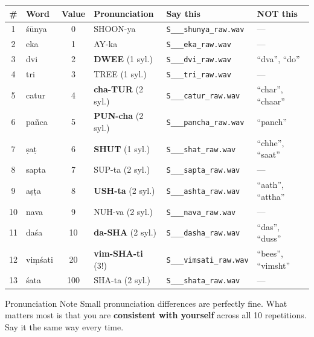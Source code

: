 \documentclass[11pt,a4paper]{article}
\begin{document}
\vspace{0.3cm}
\begin{center}
\renewcommand{\arraystretch}{1.3}
\begin{tabular}{clclll}
\toprule
\textbf{\#} & \textbf{Word} & \textbf{Value} &
\textbf{Pronunciation} & \textbf{Say this} & \textbf{NOT this} \\
\midrule
 1  & \'{s}\={u}nya       & 0   & SHOON-ya   & \texttt{S\_\_\_shunya\_raw.wav}  & --- \\
 2  & eka                  & 1   & AY-ka      & \texttt{S\_\_\_eka\_raw.wav}     & --- \\
 3  & dvi                  & 2   & \textbf{DWEE} (1 syl.)    & \texttt{S\_\_\_dvi\_raw.wav}     & ``dva'', ``do'' \\
 4  & tri                  & 3   & TREE (1 syl.)             & \texttt{S\_\_\_tri\_raw.wav}     & --- \\
 5  & catur                & 4   & \textbf{cha-TUR} (2 syl.) & \texttt{S\_\_\_catur\_raw.wav}   & ``char'', ``chaar'' \\
 6  & pa\~{n}ca            & 5   & \textbf{PUN-cha} (2 syl.) & \texttt{S\_\_\_pancha\_raw.wav}  & ``panch'' \\
 7  & \d{s}a\d{t}          & 6   & \textbf{SHUT} (1 syl.)    & \texttt{S\_\_\_shat\_raw.wav}    & ``chhe'', ``saat'' \\
 8  & sapta                & 7   & SUP-ta (2 syl.)           & \texttt{S\_\_\_sapta\_raw.wav}   & --- \\
 9  & a\d{s}\d{t}a         & 8   & \textbf{USH-ta} (2 syl.)  & \texttt{S\_\_\_ashta\_raw.wav}   & ``aath'', ``attha'' \\
10  & nava                 & 9   & NUH-va (2 syl.)           & \texttt{S\_\_\_nava\_raw.wav}    & --- \\
11  & da\'{s}a             & 10  & \textbf{da-SHA} (2 syl.)  & \texttt{S\_\_\_dasha\_raw.wav}   & ``das'', ``duss'' \\
12  & vi\d{m}\'{s}ati      & 20  & \textbf{vim-SHA-ti} (3!)  & \texttt{S\_\_\_vimsati\_raw.wav} & ``bees'', ``vimsht'' \\
13  & \'{s}ata             & 100 & SHA-ta (2 syl.)           & \texttt{S\_\_\_shata\_raw.wav}   & --- \\
\bottomrule
\end{tabular}
\end{center}

\vspace{0.3cm}
\begin{infobox}{Pronunciation Note}
Small pronunciation differences are perfectly fine.
What matters most is that you are \textbf{consistent with yourself} across all
10 repetitions. Say it the same way every time.
\end{infobox}
\end{document}
